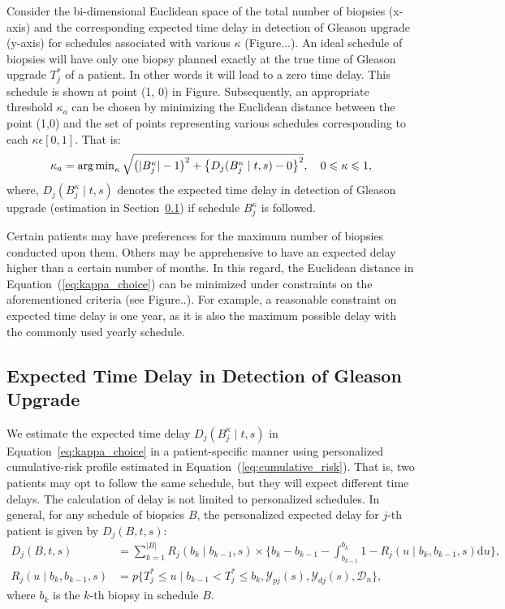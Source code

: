 Consider the bi-dimensional Euclidean space of the total number of biopsies (x-axis) and the corresponding expected time delay in detection of Gleason upgrade (y-axis) for schedules associated with various $\kappa$ (Figure...). An ideal schedule of biopsies will have only one biopsy planned exactly at the true time of Gleason upgrade $T^*_j$ of a patient. In other words it will lead to a zero time delay. This schedule is shown at point (1, 0) in Figure. Subsequently, an appropriate threshold $\kappa_a$ can be chosen by minimizing the Euclidean distance between the point (1,0) and the set of points representing various schedules corresponding to each $\kappa \epsilon [0, 1]$. That is:
\begin{equation}
\label{eq:kappa_choice}
\kappa_a = \argmin_{\kappa} \sqrt{\big(\vert B_j^\kappa \vert - 1\big)^2 + \big\{D_j(B_j^{\kappa} \mid t, s) - 0\big\}^2} , \quad 0 \leq \kappa \leq 1,
\end{equation}
where, $D_j(B_j^{\kappa} \mid t, s)$ denotes the expected time delay in detection of Gleason upgrade (estimation in Section~\ref{subsec:exp_delay_estimation}) if schedule $B_j^{\kappa}$ is followed. 

Certain patients may have preferences for the maximum number of biopsies conducted upon them. Others may be apprehensive to have an expected delay higher than a certain number of months. In this regard, the Euclidean distance in Equation~(\ref{eq:kappa_choice}) can be minimized under constraints on the aforementioned criteria (see Figure..). For example, a reasonable constraint on expected time delay is one year, as it is also the maximum possible delay with the commonly used yearly schedule.

\subsection{Expected Time Delay in Detection of Gleason Upgrade}
\label{subsec:exp_delay_estimation}
We estimate the expected time delay $D_j(B_j^{\kappa} \mid t, s)$ in Equation~\ref{eq:kappa_choice} in a patient-specific manner using personalized cumulative-risk profile estimated in Equation~(\ref{eq:cumulative_risk}). That is, two patients may opt to follow the same schedule, but they will expect different time delays. The calculation of delay is not limited to personalized schedules. In general, for any schedule of biopsies $B$, the personalized expected delay for $j$-th patient is given by $D_j(B, t, s)$:
\begin{equation}
\label{eq:expected_delay}
\begin{split}
D_j(B, t, s) &= \sum_{k=1}^{\vert B \vert} R_j(b_k \mid b_{k-1}, s) \times \Big\{b_k - b_{k-1} - \int_{b_{k-1}}^{b_k} 1 - R_j(u \mid b_k, b_{k-1}, s) \mathrm{d}u \Big\},\\
R_j(u \mid b_k, b_{k-1}, s) &= p\Big\{T^*_j \leq u \mid b_{k-1} < T^*_j \leq b_k, \mathcal{Y}_{pj}(s), \mathcal{Y}_{dj}(s), \mathcal{D}_n\Big\},
\end{split}
\end{equation}
where $b_k$ is the $k$-th biopsy in schedule $B$. 

